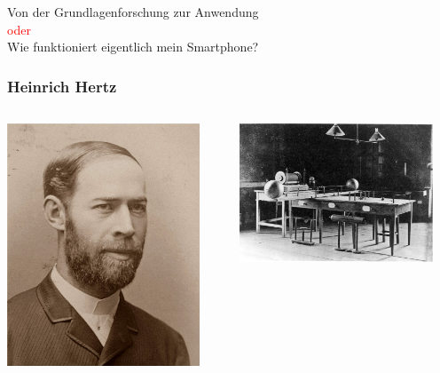 \documentclass[14pt]{beamer}
\begin{document}
\begin{frame}
	\centering
	\large{Von der Grundlagenforschung zur Anwendung}\\
	\small{\textcolor{red}{oder}}\\
	\large{Wie funktioniert eigentlich mein Smartphone?}
\end{frame}

\begin{frame}
	\frametitle{Heinrich Hertz}
	\begin{center}
		\begin{columns}
			\begin{column}{0.5\textwidth}
		\includegraphics[width=0.9\textwidth]{heinrich_hertz.jpg}
			\end{column}
			\begin{column}{0.5\textwidth}
		\includegraphics[width=0.9\textwidth]{heinrich_hertz_setup.jpg}

\end{column}
\end{columns}
\end{center}
\end{frame}
\end{document}
